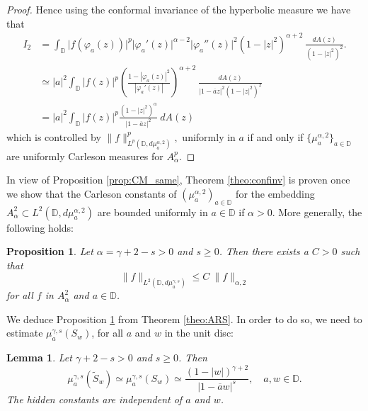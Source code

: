 \documentclass[12pt]{amsart}
\newtheorem{lemma}[theorem]{Lemma}
\newtheorem{proposition}[theorem]{Proposition}
\theoremstyle{definition}
\newcommand{\D}{\mathbb{{D}}}
\numberwithin{equation}{section}
\begin{document}
\begin{proof}
            Hence using the conformal invariance of the hyperbolic measure we have that
                \[
                    \begin{aligned}
                        I_2 & = \int_{\D} \big|f(\varphi_a(z))\big|^{p}\big|\varphi_a'(z)\big|^{\alpha - 2}\big| \varphi_a''(z)\big|^{2} (1-|z|^2)^{\alpha+2}~\frac{dA(z)}{(1-|z|^2)^2}. \\
                        & \simeq |a|^2  \int_{\D} \big|f(z)\big|^{p} \left(\frac{1-|\varphi_a(z)|^2}{|\varphi_a'(z)|}\right)^{\alpha+2} ~\frac{dA(z)}{\left|1-\overline az\right|^2(1-|z|^2)^2} \\
                        & = |a|^2 \int_{\D} \big|f(z)\big|^{p} \frac{(1-|z|^2)^{\alpha}}{|1-\overline{a}z|^2}~dA(z)
                    \end{aligned}
                \]
                which is controlled by $\|f\|_{L^p\left(\D, d\mu^{\alpha, 2}_a\right)}^p,$ uniformly in $a$ if and only if $ \{\mu_a^{\alpha, 2} \}_{a\in\D}$ are uniformly Carleson measures for $A^p_\alpha$.
        \end{proof}

        In view of Proposition \ref{prop:CM_same}, Theorem \ref{theo:confinv} is proven once we show that the Carleson constants of $(\mu^{\alpha, 2}_a)_{a\in\D}$ for the embedding $ A^2_\alpha\subset L^2(\D, d\mu^{\alpha, 2}_a)$ are bounded uniformly in $a\in\D$ if $\alpha>0$. More generally, the following holds:

        \begin{proposition}\label{prop:cm_a}
            Let $\alpha=\gamma+2-s>0$ and $s\ge0$. Then there exists a $C>0$ such that
                \[
                    \|f\|_{L^2(\D, d\mu^{\gamma, s}_a)}\leq C~\|f\|_{\alpha,2}
                \]
                for all $f$ in $A^2_\alpha$ and $a\in\D$.
        \end{proposition}

        We deduce Proposition \ref{prop:cm_a} from Theorem \ref{theo:ARS}. In order to do so, we need to estimate $\mu^{\gamma, s}_a(S_w)$, for all $a$ and $w$ in the unit disc:

        \begin{lemma}\label{lemma:mu_boxes}
            Let $\gamma+2-s>0$ and $s \geq 0$. Then
                \[
                    \mu^{\gamma, s}_a(\tilde S_w)\simeq\mu^{\gamma,s}_a(S_w)\simeq\frac{(1-|w|)^{\gamma+2}}{|1-\overline aw|^s}, \quad a, w\in\D.
                \]
                The hidden constants are independent of $a$ and $w$.
        \end{lemma}
\end{document}
